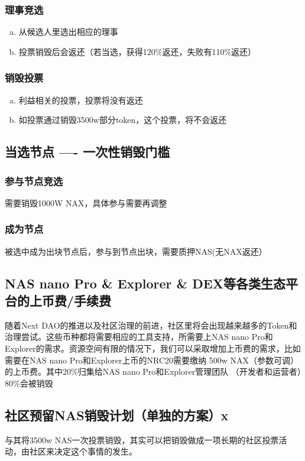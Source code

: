 \subsubsection{理事竞选}
\begin{enumerate}[a.]
  \item 从候选人里选出相应的理事
  \item 投票销毁后会返还（若当选，获得120\%返还，失败有110\%返还）
\end{enumerate}

\subsubsection{销毁投票}
\begin{enumerate}[a.]
  \item 利益相关的投票，投票将没有返还
  \item 如投票通过销毁3500w部分token，这个投票，将不会返还
\end{enumerate}

\subsection{当选节点 ---- 一次性销毁门槛}

\subsubsection{参与节点竞选}
需要销毁1000W NAX，具体参与需要再调整

\subsubsection{成为节点}
被选中成为出块节点后，参与到节点出块，需要质押NAS(无NAX返还）


\subsection{NAS nano Pro \& Explorer \& DEX等各类生态平台的上币费/手续费}
随着Next DAO的推进以及社区治理的前进，社区里将会出现越来越多的Token和治理尝试。这些币种都将需要相应的工具支持，所需要上NAS nano Pro和Explorer的需求。资源空间有限的情况下，我们可以采取增加上币费的需求，比如需要在NAS nano Pro和Explorer上币的NRC20需要缴纳 500w NAX（参数可调）的上币费。其中20\%归集给NAS nano Pro和Explorer管理团队 （开发者和运营者）80\%会被销毁

\subsection{社区预留NAS销毁计划（单独的方案）x}
与其将3500w NAS一次投票销毁，其实可以把销毁做成一项长期的社区投票活动，由社区来决定这个事情的发生。

